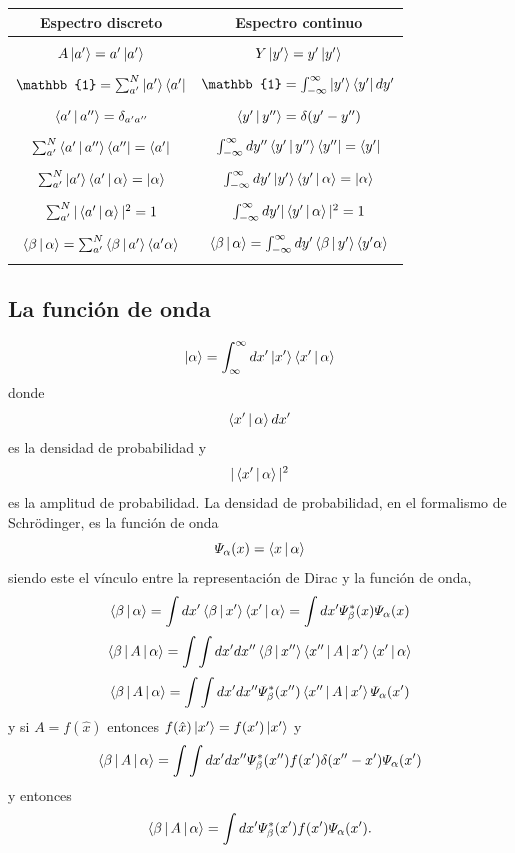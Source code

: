 \documentclass[10pt,oneside]{CBFT_book}
\begin{document}
\begin{tabular}{|c|c|}
\hline 
Espectro discreto & Espectro continuo \\
\hline
  & \\
  $A\Ket{a'}=a'\ket{a'}$ & $Y\Ket{y'}=y'\ket{y'}$ \\
  & \\
  $\mathbb{1} = \sum_{a' }^N \Ket{a'}\Bra{a'} $ & $\mathbb{1} = \int_{-\infty}^ {\infty} \Ket{y'}\Bra{y'} dy' $ \\
  & \\
  $\Braket{a'|a''} = \delta_{a' a''}$ & $\Braket{y'|y''} = \delta(y'-y'')$ \\
  & \\
  $ \sum_{a' }^N \Braket{a'|a''}\Bra{a''} = \Bra{a'}$ & $ \int_{-\infty}^\infty dy'' \Braket{y'|y''}\Bra{y''} = 
\Bra{y'}$ \\
  & \\
  $ \sum_{a' }^N \Ket{a'} \Braket{a'|\alpha} =  \Ket{\alpha}$ & $ \int_{-\infty}^\infty dy' \Ket{y'}\Braket{y'|\alpha} 
= \Ket{\alpha}$ \\
  & \\
  $ \sum_{a' }^N |\Braket{a'|\alpha}|^2 = 1$ & $ \int_{-\infty}^\infty dy'|\Braket{y'|\alpha}|^2 = 
1$ \\
  & \\
    $ \Braket{\beta | \alpha}  = \sum_{a' }^N \Braket{\beta|a'}\Braket{a'\alpha}$ & $ \Braket{\beta | \alpha}  = 
\int_{-\infty}^\infty dy' \Braket{\beta|y'}\Braket{y'\alpha}$ \\
  & \\
\hline  
\end{tabular} 

\subsection{La función de onda}

\[
	\Ket{\alpha} = \int_{\infty}^\infty dx' \Ket{x'}\Braket{x'|\alpha}
\]
donde 
\[
	\Braket{x'|\alpha}dx'
\]
es la densidad de probabilidad y 
\[
	|\Braket{x'|\alpha}|^2
\]
es la amplitud de probabilidad. La densidad de probabilidad, en el formalismo de Schrödinger, es la función de onda
\[
	\Psi_\alpha(x) = \Braket{x|\alpha}
\]
siendo este el vínculo entre la representación de Dirac y la función de onda,
\[
	\Braket{\beta|\alpha} = \int dx' \Braket{\beta|x'}\Braket{x'|\alpha} = 
		\int dx' \Psi_\beta^*(x) \Psi_\alpha(x)
\]
\[
	\Braket{\beta|A|\alpha} = \int \int dx' dx''\Braket{\beta|x''}\Braket{x''|A|x'}\Braket{x'|\alpha}
\]
\[
	\Braket{\beta|A|\alpha} = \int \int dx' dx'' \Psi_\beta^*(x'') \Braket{x''|A|x'} \Psi_\alpha(x')
\]
y si $A=f(\hat{x})$ entonces $f(\hat{x}) \Ket{x'} = f(x') \Ket{x'}$ y
\[
	\Braket{\beta|A|\alpha} = \int \int dx' dx'' \Psi_\beta^*(x'') f(x')\delta(x''-x') \Psi_\alpha(x')
\]
y entonces 
\[
	\Braket{\beta|A|\alpha} = \int dx' \Psi_\beta^*(x') f(x') \Psi_\alpha(x').
\]
\end{document}

